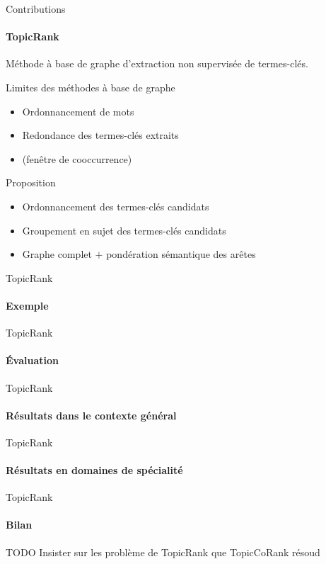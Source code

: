 \begin{frame}{Contributions}\framesubtitle{TopicRank}
  Méthode à base de graphe d'extraction non supervisée de termes-clés.

  \begin{alertblock}{Limites des méthodes à base de graphe}
    \begin{itemize}
      \item{Ordonnancement de mots}
      \item{Redondance des termes-clés extraits}
      \item{(fenêtre de cooccurrence)}
    \end{itemize}
  \end{alertblock}

  \begin{block}{Proposition}
    \begin{itemize}
      \item{Ordonnancement des termes-clés candidats}
      \item{Groupement en sujet des termes-clés candidats}
      \item{Graphe complet $+$ pondération sémantique des arêtes}
    \end{itemize}
  \end{block}
\end{frame}

\begin{frame}{TopicRank}\framesubtitle{Exemple}
\end{frame}

\begin{frame}{TopicRank}\framesubtitle{Évaluation}
\end{frame}

\begin{frame}{TopicRank}\framesubtitle{Résultats dans le contexte général}
\end{frame}

\begin{frame}{TopicRank}\framesubtitle{Résultats en domaines de spécialité}
\end{frame}

\begin{frame}{TopicRank}\framesubtitle{Bilan}
  \begin{alertblock}{TODO}
    Insister sur les problème de TopicRank que TopicCoRank résoud
  \end{alertblock}
\end{frame}

